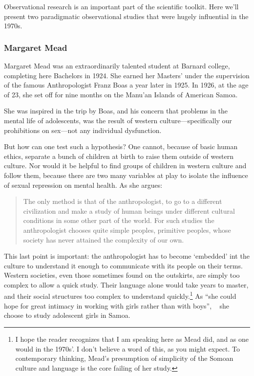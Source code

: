 \begin{refsection}
Observational research is an important part of the scientific toolkit. Here we'll present two paradigmatic observational studies that were hugely influential in the 1970s.

\subsubsection{Margaret Mead}
\label{margaretmead}

Margaret Mead was an extraordinarily talented student at Barnard college, completing here Bachelors in 1924. She earned her Masters' under the supervision of the famous Anthropologist Franz Boas a year later in 1925. In 1926, at the age of 23, she set off for nine months on the Manu'an Islands of American Samoa. 

She was inspired in the trip by Boas, and his concern that problems in the mental life of adolescents, was the result of western culture---specifically our prohibitions on sex---not any individual dysfunction. 

But how can one test such a hypothesis? One cannot, because of basic human ethics, separate a bunch of children at birth to raise them outside of western culture. Nor would it be helpful to find groups of children in western culture and follow them, because there are two many variables at play to isolate the influence of sexual repression on mental health. As she argues:

\begin{quote}

The only method is that of the anthropologist, to go to a different civilization and make a study of human beings under different cultural conditions in some other part of the world. For such studies the anthropologist chooses quite simple peoples, primitive peoples, whose society has never attained the complexity of our own. 
\end{quote}

This last point is important: the anthropologist has to become `embedded' int the culture to understand it enough to communicate with its people on their terms. Western societies, even those sometimes found on the outskirts, are simply too complex to allow a quick study. Their language alone would take years to master, and their social structures too complex to understand quickly.\footnote{I hope the reader recognizes that I am speaking here as Mead did, and as one would in the 1970s'. I don't believe a word of this, as you might expect. To contemporary thinking, Mead's presumption of simplicity of the Somoan culture and language is the core failing of her study.} As ``she could hope for great intimacy in working with girls rather than with boys'', ~\citep[p. 9]{Mead:1928uk} she choose to study adolescent girls in Samoa.


\end{refsection}
